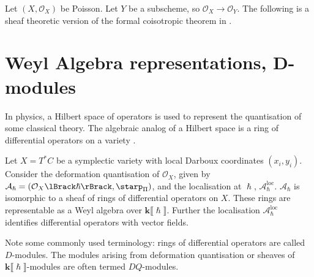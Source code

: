     Let \( (X,\mathcal{O}_X)\) be Poisson.
    Let \(Y\) be a subscheme, so \( \mathcal{O}_X \rightarrow \mathcal{O}_Y\). The following is a sheaf theoretic version of the formal coisotropic theorem in \cite{dasilva}.
    
    \begin{thm} 
 
    \end{thm}
    
    
    \section{Weyl Algebra representations, D-modules}
    \label{sec:weyl_algebra}
    
    In physics, a Hilbert space of operators is used to represent the quantisation of some classical theory. The algebraic analog of a Hilbert space is a ring of differential operators on a variety \cite{k_holonomic}. 

    Let \(X= T^* C\) be a symplectic variety with local Darboux coordinates \( (x_i,y_i)\). Consider the deformation quantisation of \( \mathcal{O}_X\), given by \( \mathcal{A}_{\hslash} = (\mathcal{O}_X\lBrack \hslash \rBrack , \starp_{\Pi}) \), and the localisation at \(\hslash\), \( \mathcal{A}_{\hslash}^{\text{loc}} \). \( \mathcal{A}_{\hslash}\) is isomorphic to a sheaf of rings of differential operators on \(X\). These rings are representable as a Weyl algebra over \( \mathbf{k} \lBrack \hslash \rBrack\). Further the localisation \( \mathcal{A}_{\hslash}^{\text{loc}}\) identifies differential operators with vector fields. 
    
    \begin{rem} Note some commonly used terminology: rings of differential operators are called \(D\)-modules. The modules arising from deformation quantisation or sheaves of \(\mathbf{k}\lBrack \hslash\rBrack \)-modules are often termed \(DQ\)-modules. 
    \end{rem}

